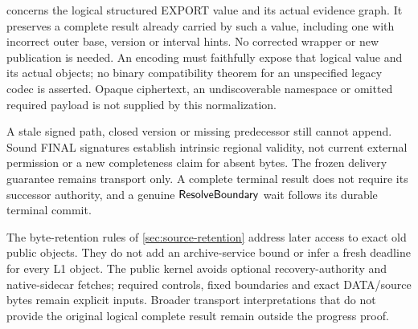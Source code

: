  concerns the logical structured EXPORT
value and its actual evidence graph. It preserves a complete result
already carried by such a value, including one with incorrect outer
base, version or interval hints. No corrected wrapper or new publication
is needed. An encoding must faithfully expose that logical value and
its actual objects; no binary compatibility theorem for an unspecified
legacy codec is asserted. Opaque ciphertext, an undiscoverable namespace
or omitted required payload is not supplied by this normalization.

A stale signed path, closed version or missing predecessor still cannot
append. Sound FINAL signatures establish intrinsic regional validity,
not current external permission or a new completeness claim for absent
bytes. The frozen delivery guarantee remains transport only. A complete
terminal result does not require its successor authority, and a genuine
$\mathsf{ResolveBoundary}$ wait follows its durable terminal commit.

The byte-retention rules of \cref{sec:source-retention} address later
access to exact old public objects. They do not add an archive-service
bound or infer a fresh deadline for every L1 object. The public kernel
avoids optional recovery-authority and native-sidecar fetches; required
controls, fixed boundaries and exact DATA/source bytes remain explicit
inputs. Broader transport interpretations that do not provide the
original logical complete result remain outside the progress proof.
